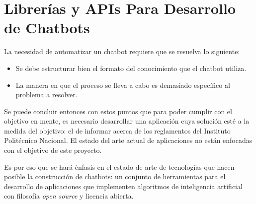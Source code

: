 


\section{Librerías y APIs Para Desarrollo de Chatbots}

La necesidad de automatizar un chatbot requiere que se resuelva lo siguiente:

\begin{itemize}
    \item Se debe estructurar bien el formato del conocimiento que el chatbot utiliza.
    \item La manera en que el proceso se lleva a cabo es demasiado específico al problema a resolver.
\end{itemize}

Se puede concluir entonces con estos puntos que para poder cumplir con el objetivo en mente, es necesario desarrollar una aplicación cuya solución esté a la medida del objetivo: el de informar acerca de los reglamentos del Instituto Politécnico Nacional. El estado del arte actual de aplicaciones no están enfocadas con el objetivo de este proyecto.

Es por eso que se hará énfasis en el estado de arte de tecnologías que hacen posible la construcción de chatbots: un conjunto de herramientas para el desarrollo de aplicaciones que implementen algoritmos de inteligencia artificial con filosofía \textit{open source} y licencia abierta. 

